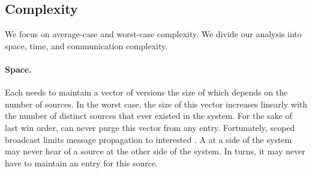 





\subsection{Complexity}

We focus on average-case and worst-case complexity. We divide our
analysis into space, time, and communication complexity.

\paragraph{Space.}
Each \process needs to maintain a vector of versions the size of which
depends on the number of sources. In the worst case, the size of this
vector increases linearly with the number of distinct sources that
ever existed in the system. For the sake of last win order, \processes
can never purge this vector from any entry.  Fortunately, scoped broadcast limits
message propagation to interested \processes. A \process at a side of
the system may never hear of a source at the other side of the
system. In turns, it may never have to maintain an entry for this
source. 

